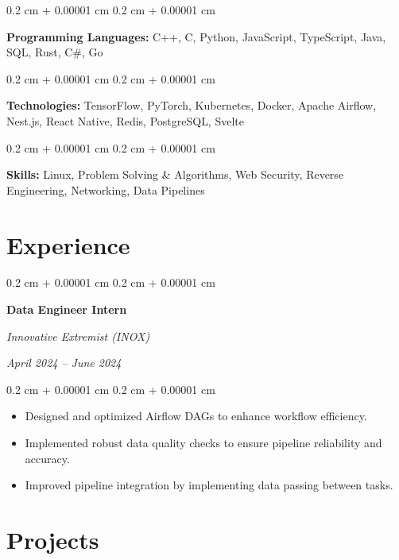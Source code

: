 \documentclass[8pt,letterpaper]{extarticle}
\newenvironment{highlights}{
    \begin{itemize}[
        topsep=0.10 cm,
        parsep=0.10 cm,
        partopsep=0pt,
        itemsep=0pt,
        leftmargin=0.4 cm + 10pt
    ]
}{
    \end{itemize}
} %
\newenvironment{onecolentry}{
    \begin{adjustwidth}{
        0.2 cm + 0.00001 cm
    }{
        0.2 cm + 0.00001 cm
    }
}{
    \end{adjustwidth}
} %
\newenvironment{twocolentry}[2][]{
    \onecolentry
    \def\secondColumn{#2}
    \setcolumnwidth{\fill, 5.0 cm}
    \begin{paracol}{2}
}{
    \switchcolumn \raggedleft \secondColumn
    \end{paracol}
    \endonecolentry
} %
\begin{document}
        \begin{onecolentry}
            \textbf{Programming Languages:} C++, C, Python, JavaScript, TypeScript, Java, SQL, Rust, C\#, Go
        \end{onecolentry}

        \vspace{0.2 cm}

        \begin{onecolentry}
            \textbf{Technologies:} TensorFlow, PyTorch, Kubernetes, Docker, Apache Airflow, Nest.js, React Native, Redis, PostgreSQL, Svelte
        \end{onecolentry}

        \vspace{0.2 cm}

        \begin{onecolentry}
            \textbf{Skills:} Linux, Problem Solving \& Algorithms, Web Security, Reverse Engineering, Networking, Data Pipelines
        \end{onecolentry}

    \section{Experience}

        \begin{twocolentry}{
            \textit{April 2024 – June 2024}}
            \textbf{Data Engineer Intern}

            \textit{Innovative Extremist (INOX)}
        \end{twocolentry}

        \vspace{0.10 cm}
        \begin{onecolentry}
            \begin{highlights}
                \item Designed and optimized Airflow DAGs to enhance workflow efficiency.
                \item Implemented robust data quality checks to ensure pipeline reliability and accuracy.
                \item Improved pipeline integration by implementing data passing between tasks.
            \end{highlights}
        \end{onecolentry}
    
        \section{Projects}
\end{document}
